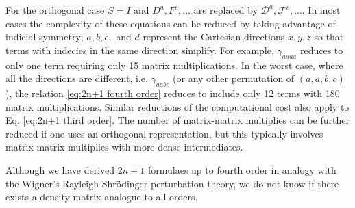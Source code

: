 \documentclass[prl,aps,preprint,showpacs,superbib]{revtex4}
\def\F{\mathcal{F}}
\def\D{\mathcal{D}}
\begin{document}
For the orthogonal case $S=I$ and $D^a,F^c,\ldots$ are replaced by $\D^a,\F^c,\ldots$.
In most cases the complexity of these equations
can be reduced by taking advantage of indicial symmetry; 
$a,b,c,$ and $d$ represent the Cartesian directions $x,y,z$
so that terms with indecies in the same direction simplify. 
For example, $\gamma_{aaaa}$ reduces to only one term requiring only 15 matrix multiplications.
In the worst case, where all the directions are different, i.e. $\gamma_{aabc}$ 
(or any other permutation of $(a,a,b,c)$), the relation \eqref{eq:2n+1 fourth order} 
reduces to include only 12 terms with 180 matrix multiplications. 
Similar reductions of the computational cost also apply to 
Eq. \eqref{eq:2n+1 third order}. The number of matrix-matrix multiplies can be further reduced
if one uses an orthogonal representation, but this typically involves matrix-matrix multiplies 
with more dense intermediates.

Although we have derived $2n+1$ formulaes up to fourth order in analogy with 
the Wigner's Rayleigh-Shr\"odinger perturbation theory, we do not know if there exists a
density matrix analogue to all orders. 
\end{document}
